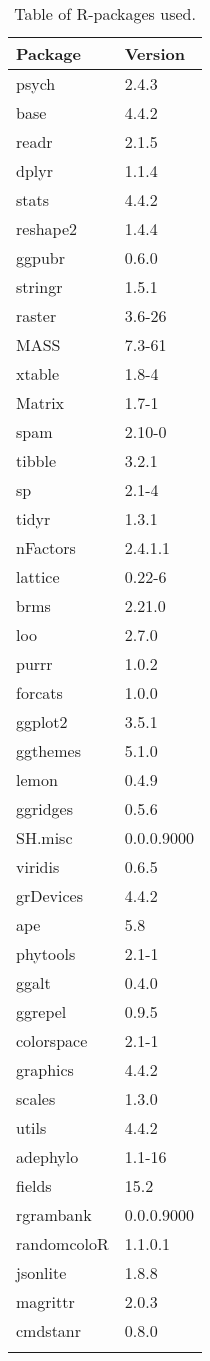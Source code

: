 \begin{longtable}{p{2.5cm}p{2.5cm}}
  \toprule
Package & Version \\ 
  \midrule
psych & 2.4.3 \\ 
  base & 4.4.2 \\ 
  readr & 2.1.5 \\ 
  dplyr & 1.1.4 \\ 
  stats & 4.4.2 \\ 
  reshape2 & 1.4.4 \\ 
  ggpubr & 0.6.0 \\ 
  stringr & 1.5.1 \\ 
  raster & 3.6-26 \\ 
  MASS & 7.3-61 \\ 
  xtable & 1.8-4 \\ 
  Matrix & 1.7-1 \\ 
  spam & 2.10-0 \\ 
  tibble & 3.2.1 \\ 
  sp & 2.1-4 \\ 
  tidyr & 1.3.1 \\ 
  nFactors & 2.4.1.1 \\ 
  lattice & 0.22-6 \\ 
  brms & 2.21.0 \\ 
  loo & 2.7.0 \\ 
  purrr & 1.0.2 \\ 
  forcats & 1.0.0 \\ 
  ggplot2 & 3.5.1 \\ 
  ggthemes & 5.1.0 \\ 
  lemon & 0.4.9 \\ 
  ggridges & 0.5.6 \\ 
  SH.misc & 0.0.0.9000 \\ 
  viridis & 0.6.5 \\ 
  grDevices & 4.4.2 \\ 
  ape & 5.8 \\ 
  phytools & 2.1-1 \\ 
  ggalt & 0.4.0 \\ 
  ggrepel & 0.9.5 \\ 
  colorspace & 2.1-1 \\ 
  graphics & 4.4.2 \\ 
  scales & 1.3.0 \\ 
  utils & 4.4.2 \\ 
  adephylo & 1.1-16 \\ 
  fields & 15.2 \\ 
  rgrambank & 0.0.0.9000 \\ 
  randomcoloR & 1.1.0.1 \\ 
  jsonlite & 1.8.8 \\ 
  magrittr & 2.0.3 \\ 
  cmdstanr & 0.8.0 \\ 
   \bottomrule
\caption{Table of R-packages used.} 
\label{r_package_table}
\end{longtable}

